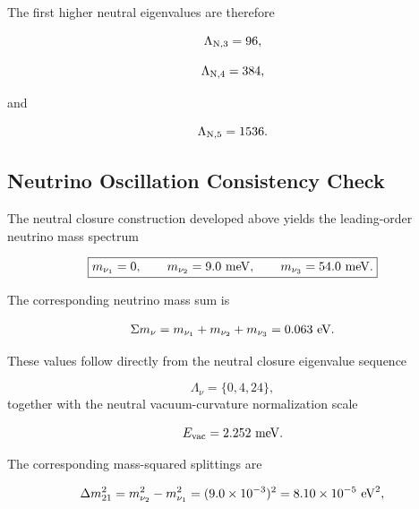 \documentclass[11pt]{article}
\theoremstyle{definition}
\theoremstyle{remark}
\begin{document}
The first higher neutral eigenvalues are therefore

\begin{equation}
\Lambda_{{\rm N},3}
=
96,
\end{equation}

\begin{equation}
\Lambda_{{\rm N},4}
=
384,
\end{equation}

and

\begin{equation}
\Lambda_{{\rm N},5}
=
1536.
\end{equation}


\subsection{Neutrino Oscillation Consistency Check} \label{subsec:neutrino_oscillation_consistency} 

The neutral closure construction developed above yields the leading-order neutrino mass spectrum 

\begin{equation} \boxed{ m_{\nu_1} = 0, \qquad m_{\nu_2} = 9.0~{\rm meV}, \qquad m_{\nu_3} = 54.0~{\rm meV}. } \label{eq:sft_neutrino_spectrum_final}
\end{equation} 

The corresponding neutrino mass sum is 

\begin{equation} \Sigma m_\nu = m_{\nu_1} + m_{\nu_2} + m_{\nu_3} = 0.063~{\rm eV}. \end{equation}

These values follow directly from the neutral closure eigenvalue sequence 

\begin{equation} \Lambda_\nu = \{0,4,24\}, 
\end{equation}
together with the neutral vacuum-curvature normalization scale

\begin{equation} E_{\rm vac} = 2.252~{\rm meV}. 
\end{equation}

The corresponding mass-squared splittings are

\begin{equation} \Delta m_{21}^2 = m_{\nu_2}^2 - m_{\nu_1}^2 = (9.0\times10^{-3})^2 = 8.10\times10^{-5}\ {\rm eV}^2, \label{eq:sft_delta21} \end{equation} 
\end{document}
